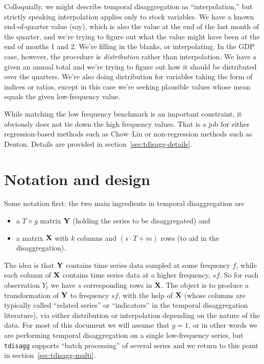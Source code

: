 Colloquially, we might describe temporal disaggregation as
``interpolation,'' but strictly speaking interpolation applies only to
stock variables. We have a known end-of-quarter value (say), which is
also the value at the end of the last month of the quarter, and we're
trying to figure out what the value might have been at the end of
months 1 and 2. We're filling in the blanks, or interpolating. In the
GDP case, however, the procedure is \textit{distribution} rather than
interpolation. We have a given an annual total and we're trying to
figure out how it should be distributed over the quarters. We're also
doing distribution for variables taking the form of indices or ratios,
except in this case we're seeking plausible values whose mean equals
the given low-frequency value.

While matching the low frequency benchmark is an important constraint,
it obviously does not tie down the high frequency values. That is a
job for either regression-based methods such as Chow--Lin or
non-regression methods such as Denton. Details are provided in
section~\ref{sec:tdisagg-details}.

\section{Notation and design}
\label{sec:tdisagg-nd}

Some notation first: the two main ingredients in temporal
disaggregation are
\begin{itemize}
\item a $T \times g$ matrix $\mathbf{Y}$ (holding the series to be
  disaggregated) and
\item a matrix $\mathbf{X}$ with $k$ columns and $(s \cdot T + m)$ rows (to
  aid in the disaggregation).
\end{itemize}
The idea is that $\mathbf{Y}$ contains time series data sampled at some
frequency $f$, while each column of $\mathbf{X}$ contains time series data at
a higher frequency, $sf$. So for each observation $Y_t$ we have $s$
corresponding rows in $\mathbf{X}$. The object is to produce a transformation
of $\mathbf{Y}$ to frequency $sf$, with the help of $\mathbf{X}$ (whose columns are
typically called ``related series'' or ``indicators'' in the temporal
disaggregation literature), via either distribution or interpolation
depending on the nature of the data. For most of this document we will
assume that $g = 1$, or in other words we are performing temporal
disaggregation on a single low-frequency series, but \texttt{tdisagg}
supports ``batch processing'' of several series and we return to this
point in section~\ref{sec:tdisagg-multi}.

